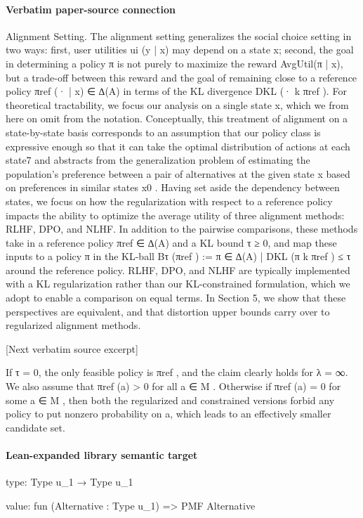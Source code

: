 \documentclass[10pt]{article}
\begin{document}
\paragraph{Verbatim paper-source connection}
\begin{ReviewVerbatim}
Alignment Setting. The alignment setting generalizes the social choice setting in two ways: first,
user utilities ui (y | x) may depend on a state x; second, the goal in determining a policy π is not
purely to maximize the reward AvgUtil(π | x), but a trade-off between this reward and the goal of
remaining close to a reference policy πref (· | x) ∈ ∆(A) in terms of the KL divergence DKL (· k πref ).
For theoretical tractability, we focus our analysis on a single state x, which we from here on omit
from the notation. Conceptually, this treatment of alignment on a state-by-state basis corresponds to
an assumption that our policy class is expressive enough so that it can take the optimal distribution of
actions at each state7 and abstracts from the generalization problem of estimating the population’s
preference between a pair of alternatives at the given state x based on preferences in similar states x0 .
Having set aside the dependency between states, we focus on how the regularization with respect
to a reference policy impacts the ability to optimize the average utility of three alignment methods:
RLHF, DPO, and NLHF. In addition to the pairwise comparisons, these methods take in a reference
policy πref ∈ ∆(A) and a KL bound τ ≥ 0, and map these inputs to a policy π in the KL-ball
Bτ (πref ) := {π ∈ ∆(A) | DKL (π k πref ) ≤ τ } around the reference policy. RLHF, DPO, and NLHF
are typically implemented with a KL regularization rather than our KL-constrained formulation,
which we adopt to enable a comparison on equal terms. In Section 5, we show that these perspectives
are equivalent, and that distortion upper bounds carry over to regularized alignment methods.

[Next verbatim source excerpt]

      If τ = 0, the only feasible policy is πref , and the claim clearly holds for λ = ∞. We also assume that
πref (a) > 0 for all a ∈ M . Otherwise if πref (a) = 0 for some a ∈ M , then both the regularized and constrained
versions forbid any policy to put nonzero probability on a, which leads to an effectively smaller candidate set.
\end{ReviewVerbatim}



\paragraph{Lean-expanded library semantic target}
\begin{ReviewVerbatim}
type:
Type u_1 → Type u_1

value:
fun (Alternative : Type u_1) => PMF Alternative
\end{ReviewVerbatim}
\end{document}
